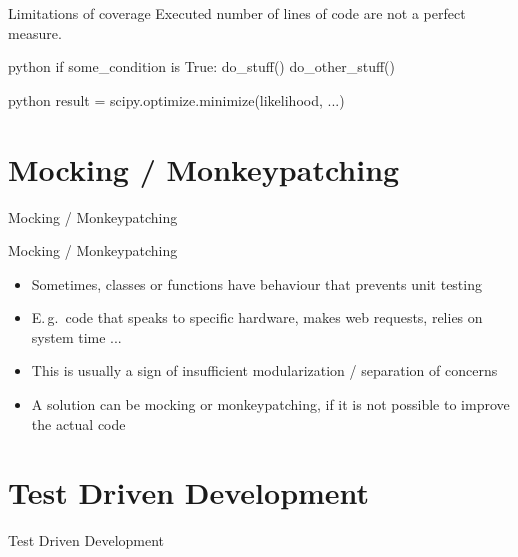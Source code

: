 \documentclass[
  aspectratio=1610,
]{beamer}
\newcommand\headlineframe[1]{%
  \begin{frame}[c]%
    \begin{center}%
      \Huge\color{vertexDarkRed}#1%
    \end{center}%
  \end{frame}%
}%
\begin{document}
\begin{frame}[c, fragile]{Limitations of coverage}
  Executed number of lines of code are not a perfect measure.
  \begin{code}{python}
    if some_condition is True:
        do_stuff()
    do_other_stuff()
  \end{code}



  \begin{code}{python}
    result = scipy.optimize.minimize(likelihood, ...)
  \end{code}

\end{frame}

\section{Mocking / Monkeypatching}
\headlineframe{Mocking / Monkeypatching}
\begin{frame}[c]{Mocking / Monkeypatching}
  \begin{itemize}
    \item Sometimes, classes or functions have behaviour that prevents unit testing
    \item E.\,g.\ code that speaks to specific hardware, makes web requests, relies on system time ...
    \item This is usually a sign of insufficient modularization / separation of concerns
    \item A solution can be mocking or monkeypatching, if it is not possible to improve the actual code
  \end{itemize}
\end{frame}

\section{Test Driven Development}
\headlineframe{Test Driven Development}
\end{document}
